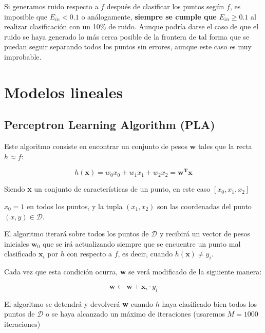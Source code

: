 \documentclass{article}
\begin{document}
    Si generamos ruido respecto a $f$ después de clasificar los puntos según $f$, es imposible que
    $E_{in} < 0.1$ o análogamente, \textbf{siempre se cumple que} $E_{in} \ge 0.1$
    al realizar clasificación con un 10\% de ruido. Aunque podría
    darse el caso de que el ruido se haya generado lo más cerca posible de la frontera de tal forma
    que se puedan seguir separando todos los puntos sin errores, aunque este caso es muy improbable.

    \pagebreak

    \section{Modelos lineales}

    \subsection{Perceptron Learning Algorithm (PLA)}

    Este algoritmo consiste en encontrar un conjunto de pesos $\textbf{w}$ tales que
    la recta $h \approx f$:

    \begin{equation*}
        h(\textbf{x}) = w_0x_0 + w_1x_1 + w_2x_2 = \textbf{w}^\textbf{T}\textbf{x}
    \end{equation*}

    Siendo \textbf{x} un conjunto de características de un punto, en este caso $[x_0, x_1, x_2]$

    $x_0 = 1$ en todos los puntos, y la tupla $(x_1, x_2)$ son las coordenadas del punto $(x,y) \in \mathcal{D}$.

    El algoritmo iterará sobre todos los puntos de $\mathcal{D}$ y
    recibirá un vector de pesos iniciales $\textbf{w}_0$ que se irá
    actualizando siempre que se encuentre un punto mal clasificado $\textbf{x}_i$ por $h$
    con respecto a $f$, es decir, cuando $h(\textbf{x}) \neq y_i$.

    Cada vez que esta condición ocurra, \textbf{w} se verá modificado de la siguiente manera:

    \begin{equation*}
        \textbf{w} \gets \textbf{w} + \textbf{x}_i \cdot y_i
    \end{equation*}

    El algoritmo se detendrá y devolverá \textbf{w} cuando $h$ haya clasificado bien todos los
    puntos de $\mathcal{D}$ o se haya alcanzado un máximo de iteraciones (usaremos $M=1000$ iteraciones)
\end{document}
